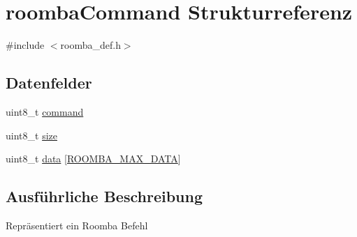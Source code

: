 \hypertarget{structroombaCommand}{\section{roomba\-Command Strukturreferenz}
\label{structroombaCommand}
}


{\ttfamily \#include $<$roomba\-\_\-def.\-h$>$}

\subsection*{Datenfelder}
\begin{DoxyCompactItemize}
\item 
uint8\-\_\-t \hyperlink{structroombaCommand_a929e434c58990186eb87063e86e25e77}{command}
\item 
uint8\-\_\-t \hyperlink{structroombaCommand_a91ec3c8d801577abb2ad793a2f3db407}{size}
\item 
uint8\-\_\-t \hyperlink{structroombaCommand_a8a3e5f08a59058c05d169663f02437d0}{data} \mbox{[}\hyperlink{group__roomba__def_ga53c32c129fde6d7594f43690d6d81d97}{R\-O\-O\-M\-B\-A\-\_\-\-M\-A\-X\-\_\-\-D\-A\-T\-A}\mbox{]}
\end{DoxyCompactItemize}


\subsection{Ausführliche Beschreibung}
Repräsentiert ein Roomba Befehl 

